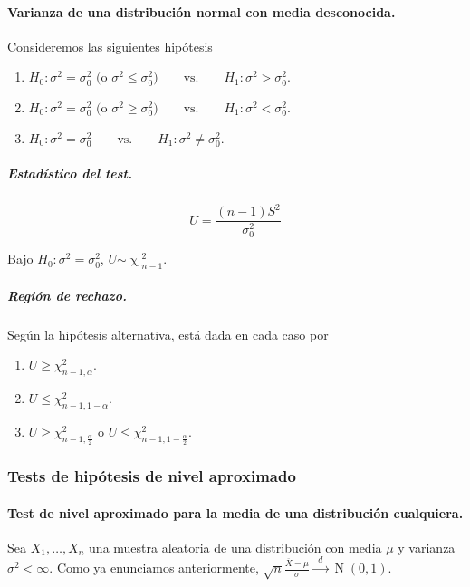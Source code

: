 \documentclass[11pt]{article}
\theoremstyle{plain}
\theoremstyle{definition}
\theoremstyle{remark}
\newcommand{\dists}[1]{\ensuremath{\operatorname{#1}}}  %
\newcommand{\dist}[1]{\ensuremath{\sim \operatorname{#1}}}  %
\newcommand{\tiende}[1]{\ensuremath{\xrightarrow{\;\; #1 \;\;}}}  %
\begin{document}
        \paragraph{Varianza de una distribución normal con media desconocida.}
          Consideremos las siguientes hipótesis
          \begin{enumerate}
            \item $ H_0 : \sigma^2 = \sigma^2_0 \text{ (o $\sigma^2 \leq \sigma^2_0$)} \qquad \text{vs.} \qquad H_1 : \sigma^2 > \sigma^2_0 $.
            \item $ H_0 : \sigma^2 = \sigma^2_0 \text{ (o $\sigma^2 \geq \sigma^2_0$)} \qquad \text{vs.} \qquad H_1 : \sigma^2 < \sigma^2_0 $.
            \item $ H_0 : \sigma^2 = \sigma^2_0 \qquad \text{vs.} \qquad H_1 : \sigma^2 \neq \sigma^2_0 $.
          \end{enumerate}

            \subparagraph{Estadístico del test.}
            \[ U = \frac{(n - 1) S^2}{\sigma_0^2} \]

            Bajo $H_0 : \sigma^2 = \sigma^2_0$, $U \dist{\chi}^2_{n - 1}$.

            \subparagraph{Región de rechazo.} Según la hipótesis alternativa, está dada en cada caso por
            \begin{enumerate}
              \item $U \geq \chi^2_{n - 1,\alpha}$.
              \item $U \leq \chi^2_{n - 1,1 - \alpha}$.
              \item $U \geq \chi^2_{n - 1,\frac{\alpha}{2}}$ o $U \leq \chi^2_{n - 1,1 - \frac{\alpha}{2}}$.
            \end{enumerate}

      \subsubsection{Tests de hipótesis de nivel aproximado}

        \paragraph{Test de nivel aproximado para la media de una distribución cualquiera.}

        Sea $X_1, \dots, X_n$ una muestra aleatoria de una distribución con media $\mu$ y varianza $\sigma^2 < \infty$. Como ya enunciamos anteriormente, $\sqrt{n} \frac{\overline{X} - \mu}{\sigma} \tiende{d} \dists{N}(0,1)$.
\end{document}
